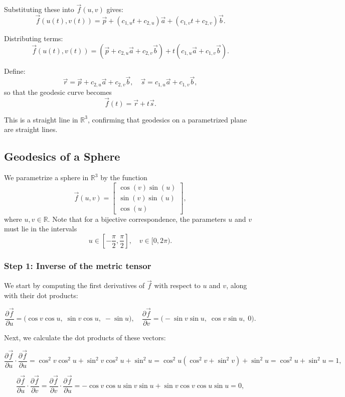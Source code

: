 \documentclass{article}
\begin{document}
	Substituting these into $\vec{f}(u, v)$ gives:
	\[
	\vec{f}(u(t), v(t)) = \vec{p} + \left(c_{1,u} t + c_{2,u}\right)\vec{a} + \left(c_{1,v} t + c_{2,v}\right)\vec{b}.
	\]
	
	Distributing terms:
	\[
	\vec{f}(u(t), v(t)) = \left(\vec{p} + c_{2,u} \vec{a} + c_{2,v} \vec{b} \right) + t \left(c_{1,u} \vec{a} + c_{1,v} \vec{b} \right).
	\]
	
	Define:
	\[
	\vec{r} = \vec{p} + c_{2,u} \vec{a} + c_{2,v} \vec{b}, \quad \vec{s} = c_{1,u} \vec{a} + c_{1,v} \vec{b},
	\]
	so that the geodesic curve becomes
	\[
	\vec{f}(t) = \vec{r} + t \vec{s}.
	\]
	
	This is a straight line in $\mathbb{R}^3$, confirming that geodesics on a parametrized plane are straight lines.
	\subsection{Geodesics of a Sphere}
		We parametrize a sphere in \(\mathbb{R}^3\) by the function
		\[
		\vec{f}(u,v) =
		\begin{bmatrix}
			\cos(v) \sin(u) \\
			\sin(v) \sin(u) \\
			\cos(u)
		\end{bmatrix},
		\tag{1}
		\]
		where \(u, v \in \mathbb{R}\). Note that for a bijective correspondence, the parameters \(u\) and \(v\) must lie in the intervals
		\[
		u \in \left[-\frac{\pi}{2}, \frac{\pi}{2}\right], \quad v \in [0, 2\pi).
		\]
		\subsubsection{Step 1: Inverse of the metric tensor}
		We start by computing the first derivatives of \(\vec{f}\) with respect to \(u\) and \(v\), along with their dot products:
		
		\[
		\frac{\partial \vec{f}}{\partial u} = \bigl(\cos v \cos u, \; \sin v \cos u, \; -\sin u \bigr),
		\quad
		\frac{\partial \vec{f}}{\partial v} = \bigl(-\sin v \sin u, \; \cos v \sin u, \; 0 \bigr).
		\]
		
		Next, we calculate the dot products of these vectors:
		
		\[
		\frac{\partial \vec{f}}{\partial u} \cdot \frac{\partial \vec{f}}{\partial u} 
		= \cos^2 v \cos^2 u + \sin^2 v \cos^2 u + \sin^2 u 
		= \cos^2 u ( \cos^2 v + \sin^2 v ) + \sin^2 u = \cos^2 u + \sin^2 u = 1,
		\]
		
		\[
		\frac{\partial \vec{f}}{\partial u} \cdot \frac{\partial \vec{f}}{\partial v} 
		= \frac{\partial \vec{f}}{\partial v} \cdot \frac{\partial \vec{f}}{\partial u} 
		= -\cos v \cos u \sin v \sin u + \sin v \cos v \cos u \sin u = 0,
		\]
		
\end{document}
